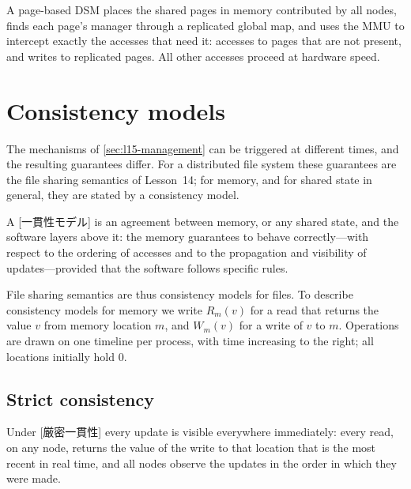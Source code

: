 \documentclass[../main.tex]{subfiles}
\begin{document}
\begin{keypoint}
  A page-based DSM places the shared pages in memory contributed by all
  nodes, finds each page's manager through a replicated global map, and
  uses the MMU to intercept exactly the accesses that need it: accesses to
  pages that are not present, and writes to replicated pages.  All other
  accesses proceed at hardware speed.
\end{keypoint}

\section{Consistency models}
\label{sec:l15-models}

The mechanisms of \cref{sec:l15-management} can be triggered at different
times, and the resulting guarantees differ.  For a
distributed file system these guarantees are the file sharing semantics of
Lesson~14; for memory, and for shared state in general, they are stated by
a consistency model.

\begin{definition}
  A [一貫性モデル] is an agreement between memory,
  or any shared state, and the software layers above it: the memory
  guarantees to behave correctly---with respect to the ordering of
  accesses and to the propagation and visibility of updates---provided
  that the software follows specific rules.
\end{definition}

File sharing semantics are thus consistency models for files.  To describe
consistency models for memory we write $R_{m}(v)$ for a read
that returns the value $v$ from memory location $m$, and $W_{m}(v)$ for a
write of $v$ to $m$.  Operations are drawn on one timeline per process,
with time increasing to the right; all locations initially hold
0.

\subsection{Strict consistency}

\begin{definition}
  Under [厳密一貫性] every update is visible
  everywhere immediately: every read, on any node, returns the value of the
  write to that location that is the most recent in real time, and all
  nodes observe the updates in the order in which they were made.
\end{definition}
\end{document}

